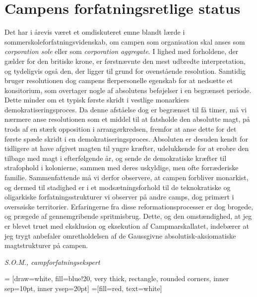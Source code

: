 \begin{minipage}[b]{0.95\linewidth}
\begin{minipage}[t]{0.47\textwidth}
\section*{Campens forfatningsretlige status}
Det har i årevis været et omdiskuteret emne blandt lærde i sommerskoleforfatningsvidenskab, om campen som organisation skal anses som \emph{corporation sole} eller som \emph{corporation aggregate}. I lighed med forholdene, der gælder for den britiske krone, er førstnævnte den mest udbredte interpretation, og tydeligvis også den, der ligger til grund for ovenstående resolution. Samtidig bruger resolutionen dog campens flerpersonelle egenskab for at nedsætte et konsitorium, som overtager nogle af absolutens beføjelser i en begrænset periode. Dette minder om et typisk første skridt i vestlige monarkiers demokratiseringsproces. Da denne afståelse dog er begrænset til få timer, må vi nærmere anse resolutionen som et middel til at fatsholde den absolutte magt, på trods af en stærk opposition i arrangørkredsen, fremfor at anse dette for det første spæde skridt i en demokratiseringsproces. Absoluten er desuden kendt for tidligere at have afgivet magten til yngre kræfter, udelukkende for at erobre den tilbage med magt i efterfølgende år, og sende de demokratiske kræfter til strafophold i kolonierne, sammen med deres uskyldige, men ofte forræderiske familie. Sammenfattende må vi derfor observere, at campen forbliver monarkist, og dermed til stadighed er i et modsætningsforhold til de teknokratiske og oligarkiske forfatningsstrukturer vi observer på andre camps, dog primært i oversøiske territorier. Erfaringerne fra disse reformationsprocesser er dog brogede, og prægede af gennemgribende spritmisbrug.  Dette, og den omstændighed, at jeg er blevet truet med eksklusion og eksekution af Campmarskallatet, indebærer at jeg trygt anbefaler omretholdelsen af de Gaussgivne absolutisk-aksiomatiske magtstrukturer på campen.

{\flushright\emph{S.O.M., campforfatningsekspert}}

\end{minipage}
\hfill\begin{minipage}[t]{0.47\textwidth}

\vspace{1mm}
 = [draw=white, fill=blue!20, very thick,
    rectangle, rounded corners, inner sep=10pt, inner ysep=20pt]
 =[fill=red, text=white]


\end{minipage}
\end{minipage}
